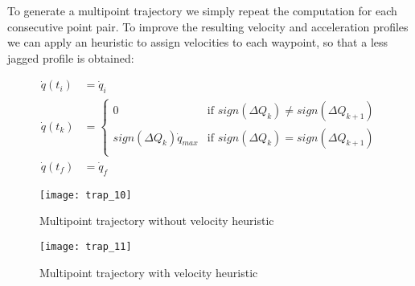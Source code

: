 To generate a multipoint trajectory we simply repeat the computation for each consecutive point pair. To improve the resulting velocity and acceleration profiles we can apply an heuristic to assign velocities to each waypoint, so that a less jagged profile is obtained:

\begin{align*}
\dot q(t_i)&=\dot q_i\\
\dot q(t_k)&=\begin{cases}
0 & \text{if }sign(\Delta Q_k)\neq sign(\Delta Q_{k+1})\\
sign(\Delta Q_k)\dot q_{max}& \text{if }sign(\Delta Q_k)= sign(\Delta Q_{k+1})\\
\end{cases}\\
\dot q(t_f)&=\dot q_f
\end{align*}

\begin{figure}
\begin{minipage}{0.5\textwidth}
\centering
\texttt{[image: trap\_10]}
\caption{Multipoint trajectory without velocity heuristic}
\label{fig:trap_10}
\end{minipage}
\begin{minipage}{0.5\textwidth}
\centering
\texttt{[image: trap\_11]}
\caption{Multipoint trajectory with velocity heuristic}
\label{fig:trap_11}
\end{minipage}
\end{figure}